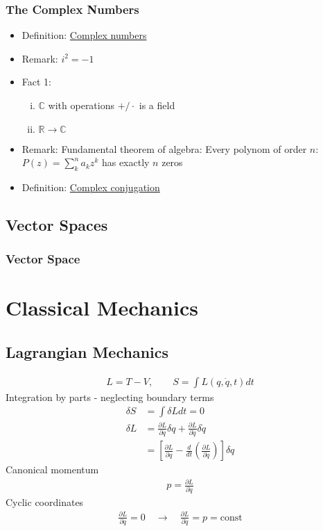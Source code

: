 \documentclass[../main.tex]{subfiles}
\begin{document}
\subsubsection{The Complex Numbers}
\begin{itemize}
\item[] {\sc Definition}: \underline{Complex numbers}
\item[] {\sc Remark}: $i^2=-1$
\item[] {\sc Fact 1}: 
\begin{enumerate}[(i)]
\item $\mathbb{C}$ with operations $+/\cdot$ is a field
\item $\mathbb{R}\rightarrow\mathbb{C}$
\end{enumerate}
\item[] {\sc Remark}: Fundamental theorem of algebra: Every polynom of order $n$: $P(z)=\sum_k^na_kz^k$ has exactly $n$ zeros
\item[] {\sc Definition}: \underline{Complex conjugation}


\end{itemize}

\subsection{Vector Spaces}
\subsubsection{Vector Space}

\section{Classical Mechanics}

\subsection{Lagrangian Mechanics}
\begin{align}
L=T-V,\qquad S=\int L(q,\dot{q},t) dt
\end{align}
Integration by parts - neglecting boundary terms
\begin{align}
\delta S&=\int \delta L dt=0\\
\delta L&=\frac{\partial L}{\partial q}\delta q+\frac{\partial L}{\partial \dot{q}}\delta \dot{q}\\
&=\left[\frac{\partial L}{\partial q}-\frac{d}{dt}\left(\frac{\partial L}{\partial \dot{q}}\right)\right]\delta q
\end{align}
Canonical momentum
\begin{align}
p=\frac{\partial L}{\partial \dot{q}}
\end{align}
Cyclic coordinates
\begin{align}
\frac{\partial L}{\partial q}=0\quad\rightarrow\quad\frac{\partial L}{\partial \dot{q}}=p=\text{const}
\end{align}
\end{document}
